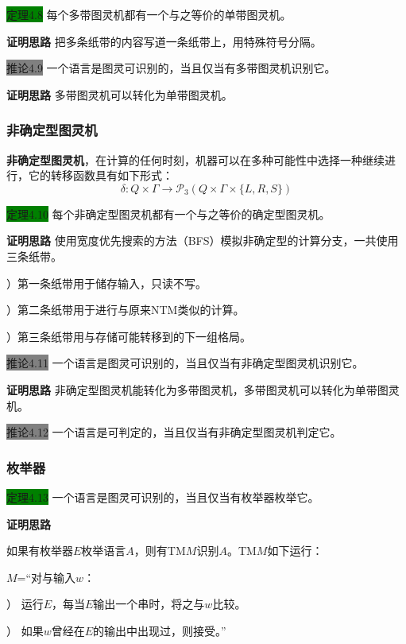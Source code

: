 \documentclass[a4paper]{article}
\begin{document}
	\colorbox{green}{定理4.8} 每个多带图灵机都有一个与之等价的单带图灵机。
	
	\textbf{证明思路} \quad 把多条纸带的内容写道一条纸带上，用特殊符号分隔。

	\colorbox{gray}{推论4.9} 一个语言是图灵可识别的，当且仅当有多带图灵机识别它。
	
	\textbf{证明思路} \quad 多带图灵机可以转化为单带图灵机。

\subsubsection{非确定型图灵机}

	\textbf{非确定型图灵机}，在计算的任何时刻，机器可以在多种可能性中选择一种继续进行，它的转移函数具有如下形式：
	$$\delta: Q \times \Gamma \rightarrow \mathcal{P}_3(Q \times \Gamma \times \{L,R,S\})$$

	\colorbox{green}{定理4.10} 每个非确定型图灵机都有一个与之等价的确定型图灵机。
	
	\textbf{证明思路} \quad 使用宽度优先搜索的方法（BFS）模拟非确定型的计算分支，一共使用三条纸带。
	
	）第一条纸带用于储存输入，只读不写。
	
	）第二条纸带用于进行与原来NTM类似的计算。
	
	）第三条纸带用与存储可能转移到的下一组格局。

	\colorbox{gray}{推论4.11} 一个语言是图灵可识别的，当且仅当有非确定型图灵机识别它。
	
	\textbf{证明思路} \quad 非确定型图灵机能转化为多带图灵机，多带图灵机可以转化为单带图灵机。
	
	\colorbox{gray}{推论4.12} 一个语言是可判定的，当且仅当有非确定型图灵机判定它。

\subsubsection{枚举器}

	\colorbox{green}{定理4.13} 一个语言是图灵可识别的，当且仅当有枚举器枚举它。
	
	\textbf{证明思路}
	
	如果有枚举器$E$枚举语言$A$，则有TM$M$识别$A$。TM$M$如下运行：
	
	$M$=“对与输入$w$：
	
	） 运行$E$，每当$E$输出一个串时，将之与$w$比较。
	
	） 如果$w$曾经在$E$的输出中出现过，则接受。”
\end{document}
